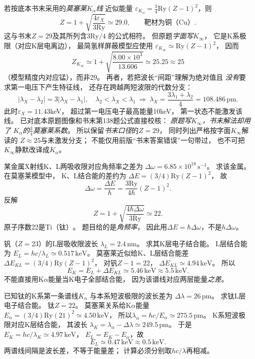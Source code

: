 若按底本书末采用的\emph{莫塞莱$K_\alpha$线}
近似能量
$\varepsilon_{K_\alpha}
=\frac34\mathrm{Ry}(Z-1)^2$，则
\[
 \boxed{Z=1+\sqrt{\frac{4\varepsilon_X}{3\mathrm{Ry}}}
 \simeq29.0},\qquad
 \boxed{\text{靶材为铜（Cu）}}.
\]
这与书末$Z=29$及其所列含$3\mathrm{Ry}/4$
的公式相符。
但原题\emph{字面写$K_\infty$}，
它是K系极限（对应K层电离边），
最简氢样屏蔽模型应使用
$\varepsilon_{K_\infty}\simeq\mathrm{Ry}(Z-1)^2$，
因而
\[
 \boxed{Z_{K_\infty}\simeq
 1+\sqrt{\frac{8.00\times10^3}{13.606}}
 \simeq25.25\approx25}
\]
（模型精度内对应锰），而非29。
再者，若把波长“间距”理解为绝对值且
\emph{没有}要求第一电压下产生特征线，
还存在跨越两短波限的代数分支：
\[
 |\lambda_X-\lambda_2|=3|\lambda_X-\lambda_1|,
 \quad
 \lambda_2<\lambda_X<\lambda_1
 \ \Longrightarrow\
 \lambda_X=\frac{3\lambda_1+\lambda_2}{4}
 =108.486\,\mathrm{pm}.
\]
此时$\varepsilon_X=11.43$keV，
超过第一电压电子最高能量10keV，
第一状态不能激发该线。
\excheck 已对底本原题图像和书末第138题公式直接校核：
\emph{原题写$K_\infty$，书末解法却用了
$K_\alpha$的$\frac34$莫塞莱系数}。
所以保留\emph{书末口径}的$Z=29$，
同时列出严格按字面$K_\infty$解读的
$Z\approx25$与未激发分支；
不能仅用前版“书末答案错误”一句带过，
也不可把$K_\infty$静默改译成$K_\alpha$。

某金属X射线K、L两吸收限对应角频率之差为
$\Delta\omega=6.85\times10^{18}\,\mathrm{s^{-1}}$。
求该金属。
\exsolution
在莫塞莱模型中，
K、L结合能的差约为
$\Delta E=(3/4)\mathrm{Ry}(Z-1)^2$，
故
\[
 \Delta\omega=\frac{\Delta E}{\hbar}
 =\frac{3\mathrm{Ry}}{4\hbar}(Z-1)^2.
\]
反解
\[
 \boxed{Z=1+\sqrt{\frac{4\hbar\Delta\omega}
 {3\mathrm{Ry}}}\simeq22}.
\]
原子序数22是$\boxed{\mathrm{Ti}\text{（钛）}}$。
\excheck 题目给的是\emph{角频率}，
因此用$\Delta E=\hbar\Delta\omega$，不是$h\Delta\omega$。

钒（$Z=23$）的L层吸收限波长
$\lambda_L=2.4\,\mathrm{nm}$。
求其K层电子结合能。
\exsolution
L层结合能为
$E_L=hc/\lambda_L\simeq0.517\,\mathrm{keV}$。
莫塞莱近似给K、L层结合能差
$\Delta E_{KL}=(3/4)\mathrm{Ry}(Z-1)^2$，
对钒$Z-1=22$，
$\Delta E_{KL}\simeq4.94\,\mathrm{keV}$。
所以
\[
 \boxed{E_K=E_L+\Delta E_{KL}\simeq5.46\,\mathrm{keV}
 \approx5.5\,\mathrm{keV}}.
\]
\excheck 不能直接用K$\alpha$能量当K电子全部结合能，
因为该谱线对应两层能量\emph{之差}。

已知钛的K系第一条谱线$K_\alpha$
与本系短波极限的波长差为
$\Delta\lambda=26\,\mathrm{pm}$。
求钛L层电子结合能。
\exsolution
钛$Z=22$。
莫塞莱关系给K$\alpha$能量
$E_\alpha=(3/4)\mathrm{Ry}(21)^2
\simeq4.50\,\mathrm{keV}$，
所以$\lambda_\alpha=hc/E_\alpha\simeq275.5\,\mathrm{pm}$。
K系短波极限对应K层结合能，
其波长
$\lambda_K=\lambda_\alpha-\Delta\lambda
\simeq249.5\,\mathrm{pm}$。
于是
$E_K=hc/\lambda_K\simeq4.97\,\mathrm{keV}$，
$E_L=E_K-E_\alpha$，故
\[
 \boxed{E_L\simeq0.47\,\mathrm{keV}
 \approx0.5\,\mathrm{keV}}.
\]
\excheck 两谱线间隔是波长差，不等于能量差；
计算必须分别取$hc/\lambda$再相减。

